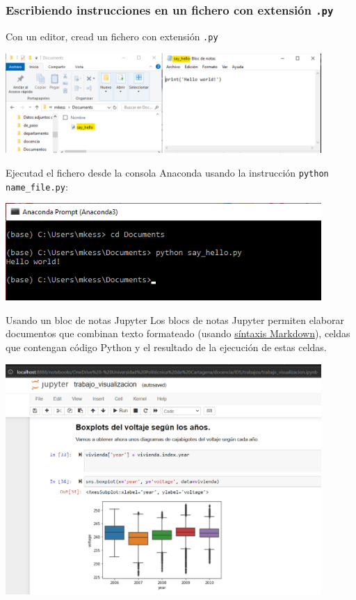 \documentclass[9pt]{beamer}
\newcommand{\inlinecode}[2][Python]{\lstinline[language=#1, basicstyle=\color{mycodecolor}]{#2}}
\begin{document}
          \begin{frame}
            \frametitle{Escribiendo instrucciones en un fichero con extensión
              {\tt .py}}
            Con un editor,  cread un fichero con extensión  {\tt .py}
            \begin{center}
              \includegraphics[width=0.9\textwidth]{say_hello_composition}
            \end{center}
            \pause
            Ejecutad el fichero desde la consola Anaconda usando la
            instrucción
            \inlinecode[bash]{python name_file.py}:
            \begin{center}
              \includegraphics[width=0.9\textwidth]{say_hello_prompt}
            \end{center}
            
          \end{frame}
          \begin{frame}{Usando un bloc de notas Jupyter }
            Los blocs de notas Jupyter permiten elaborar documentos
            que combinan texto formateado (usando 
            \href{https://en.wikipedia.org/wiki/Markdown}{síntaxis
              Markdown}), celdas que contengan código Python y el
            resultado de la ejecución de estas celdas.
            \begin{center}
              \includegraphics[width=0.9\textwidth]{jupyter_notebook}
            \end{center}
          \end{frame}
\end{document}
